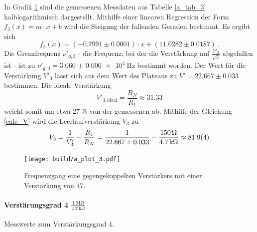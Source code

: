 In Grafik \ref{fig:a_plot_3} sind die gemessenen Messdaten aus Tabelle \ref{a_tab_3} halblogarithmisch dargestellt.
Mithilfe einer linearen Regression der Form $f_3(x)=m \cdot x + b$ wird die Steigung der fallenden Geraden bestimmt.
Es ergibt sich
\begin{equation*}
    f_3(x) = (-0.7991\pm0.0001) \cdot x + (11.0282\pm0.0187)\,.
\end{equation*}
Die Grenzfrequenz $\nu'_{g,3}$ - die Frequenz, bei der die Verstärkung auf $\frac{V'_3}{\sqrt{3}}$ abgefallen ist - ist zu $\nu'_{g,3} = \SI{3.060(6)e4}{\hertz}$ bestimmt worden.
Der Wert für die Verstärkung $V'_3$ lässt sich aus dem Wert des Plateaus zu $V'=22.667\pm0.033$ bestimmen.
Die ideale Verstärkung 
\begin{equation*}
    V'_{3,\text{ideal}} = \frac{R_N}{R_1} \approx 31.33
\end{equation*}
weicht somit um etwa $\SI{27}{\percent}$ von der gemessenen ab.
Mithilfe der Gleichung \eqref{calc_V} wird die Leerlaufverstärkung $V_3$ zu
\begin{equation*}
    V_3 = \frac{1}{V'_3} - \frac{R_1}{R_N} = \frac{1}{22.667\pm0.033} - \frac{\SI{150}{\ohm}}{\SI{4.7}{\kilo\ohm}} \approx \num{81.9\pm0.4}
\end{equation*}

\begin{figure}[h!]
    \centering
    \texttt{[image: build/a\_plot\_3.pdf]}
    \caption{Frequenzgang eine gegengekoppelten Verstärkers mit einer Verstärkung von $47$.}
    \label{fig:a_plot_3}
\end{figure}

\paragraph{Verstärungsgrad 4 $\frac{\SI{1}{\mega\ohm}}{\SI{4.7}{\kilo\ohm}}$}

\begin{table}
\centering
\caption{Messwerte zum Verstärkungsgrad 4.}
    \label{tab:a_messwerte_4}
    
\end{table}


